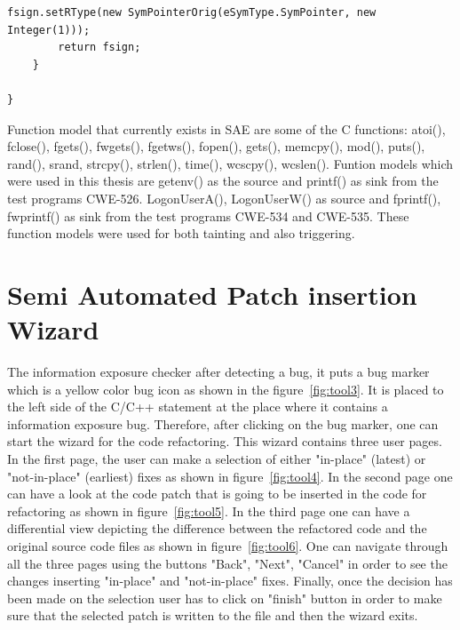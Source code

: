 \begin{lstlisting}[caption={Function model of printf()},label={lst:printf()}]
		fsign.setRType(new SymPointerOrig(eSymType.SymPointer, new Integer(1)));
		return fsign;
	}

}
\end{lstlisting}


Function model that currently exists in SAE are some of the C functions:
atoi(), fclose(), fgets(), fwgets(),
fgetws(), fopen(), gets(), memcpy(), mod(),
puts(), rand(), srand, strcpy(), strlen(),
time(), wcscpy(), wcslen().
Funtion models which were used in this thesis are getenv()
as the source and printf() as sink from the test programs CWE-526.
LogonUserA(), LogonUserW() as source and fprintf(), fwprintf() as sink
from the test programs CWE-534 and CWE-535.
These function models were used for both tainting and also triggering.



\section{Semi Automated Patch insertion Wizard}
The information exposure checker after detecting a bug, it puts
a bug marker which is a yellow color bug icon
as shown in the figure~\ref{fig:tool3}. It is placed to the left side
of the C/C++ statement at the place where it contains a information
exposure bug. Therefore, after clicking on the bug marker, one
can start the wizard for the code refactoring. This wizard
contains three user pages. In the first page, the user can make
a selection of either "in-place" (latest) or
"not-in-place" (earliest) fixes as shown in figure~\ref{fig:tool4}.  
In the second page one can have a look at the code patch that
is going to be inserted in the code for refactoring as shown in figure~\ref{fig:tool5}. In the third
page one can have a differential view depicting the 
difference between the refactored code and the original 
source code files as shown in figure~\ref{fig:tool6}. One can navigate through all the three pages 
using the buttons "Back", "Next", "Cancel" in order to see the 
changes inserting "in-place" and "not-in-place" fixes.
Finally, once the decision has been made on the selection
user has to click on "finish" button in order to make sure that
the selected patch is written to the file and then the wizard 
exits.

